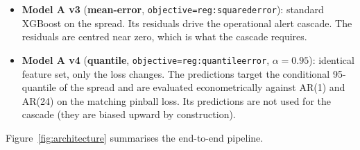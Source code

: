 \documentclass[11pt,a4paper]{article}
\begin{document}
\begin{itemize}
\item \textbf{Model A v3} (\textbf{mean-error},
\texttt{objective=reg:squarederror}): standard XGBoost on the spread.
Its residuals drive the operational alert cascade.
The residuals are centred near zero, which is what the cascade
requires.
\item \textbf{Model A v4} (\textbf{quantile},
\texttt{objective=reg:quantileerror}, $\alpha = 0.95$): identical
feature set, only the loss changes. The predictions target the
conditional 95-quantile of the spread and are evaluated
econometrically against AR(1) and AR(24) on the matching pinball
loss. Its predictions are not used for the cascade (they are biased
upward by construction).
\end{itemize}

Figure~\ref{fig:architecture} summarises the end-to-end pipeline.
\end{document}
